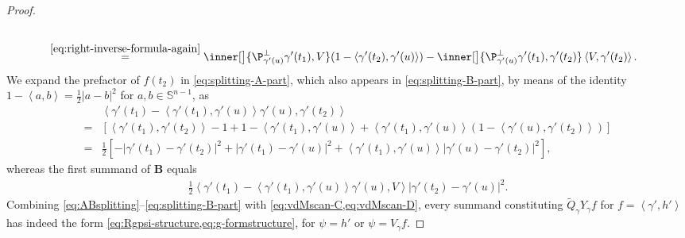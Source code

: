 \begin{proof}
\begin{equation}
\begin{aligned}
{            }\\
            &\overset{\cref{eq:right-inverse-formula-again}}{=}
            \inner[\big]{
                 \P^\perp_{\gamma'(u)} \gamma'(t_1)
                 , V
            }(1-\left\langle \gamma'(t_2),\gamma'(u) \right\rangle )-
            \inner[\big]{
                 \P^\perp_{\gamma'(u)} \gamma'(t_1)
                 , 
                \gamma'(t_2)               
            }
            \left\langle V,\gamma'(t_2) \right\rangle.
\end{aligned}
\end{equation}
We expand the prefactor of $ f(t_2) $ in \cref{eq:splitting-A-part}, which also appears in \cref{eq:splitting-B-part}, by means of the identity $ 1-\left\langle a,b \right\rangle=\frac{1}{2}\left|a-b \right|^2  $ for $ a,b\in \mathbb{S}^{n-1} $, as 
\begin{equation}\label{eq:vdMscan-C}
\begin{aligned}
    &\left\langle \gamma'(t_1)-\left\langle \gamma'(t_1),\gamma'(u) \right\rangle\gamma'(u),\gamma'(t_2)  \right\rangle \\
    =&\left[\left\langle \gamma'(t_1),\gamma'(t_2) \right\rangle -1
    +1-\left\langle \gamma'(t_1),\gamma'(u) \right\rangle 
    +\left\langle \gamma'(t_1),\gamma'(u) \right\rangle (1-\left\langle \gamma'(u),\gamma'(t_2) \right\rangle )
    \right]\\
    =&\textstyle\frac{1}{2}\left[-\left|\gamma'(t_1)-\gamma'(t_2) \right|^2+\left|\gamma'(t_1)-\gamma'(u) \right|^2+\left\langle \gamma'(t_1),\gamma'(u) \right\rangle\left|\gamma'(u)-\gamma'(t_2) \right|^2 \right],
\end{aligned}
\end{equation}
whereas the first summand of $ \mathbf{B} $ equals 
\begin{equation}\label{eq:vdMscan-D}
\begin{aligned}\textstyle
    \frac12 \left\langle \gamma'(t_1)-\left\langle \gamma'(t_1),\gamma'(u) \right\rangle\gamma'(u),V  \right\rangle \left|\gamma'(t_2)-\gamma'(u) \right|^2.
\end{aligned}
\end{equation}
Combining \eqref{eq:ABsplitting}--\eqref{eq:splitting-B-part} with \cref{eq:vdMscan-C,eq:vdMscan-D}, every summand constituting $ \widetilde{Q}_{\gamma}Y_\gamma f $ for $ f=\left\langle \gamma',h' \right\rangle  $ has indeed the form \cref{eq:Rgpsi-structure,eq:g-formstructure}, for $ \psi=h' $ or $ \psi =V_\gamma f $.
\end{proof}  
